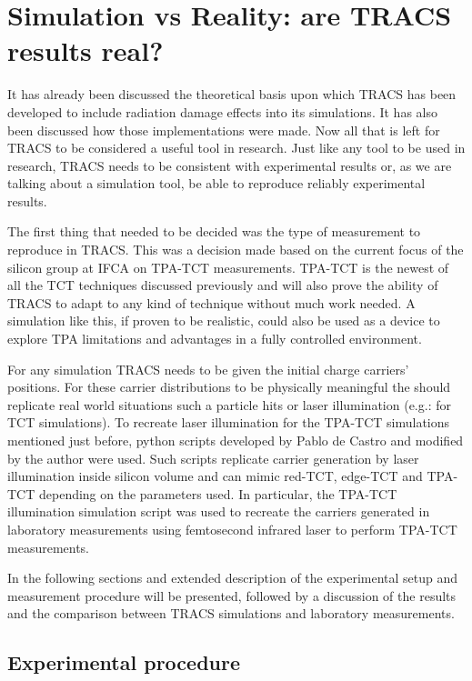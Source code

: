 \chapter{Simulation vs Reality: are TRACS results real?}

It has already been discussed the theoretical basis upon which TRACS has been developed to include radiation damage effects into its simulations. It has also been discussed how those implementations were made. Now all that is left for TRACS to be considered a useful tool in research. Just like any tool to be used in research, TRACS needs to be consistent with experimental results or, as we are talking about a simulation tool, be able to reproduce reliably experimental results.

The first thing that needed to be decided was the type of measurement to reproduce in TRACS. This was a decision made based on the current focus of the silicon group at IFCA \iffalse No se el nombre oficial \fi on TPA-TCT measurements. TPA-TCT is the newest  of all the TCT techniques discussed previously and will also prove the ability of TRACS to adapt to any kind of technique without much work needed. A simulation like this, if proven to be realistic, could also be used as a device to explore TPA limitations and advantages in a fully controlled environment.

For any simulation TRACS needs to be given the initial charge carriers' positions. For these carrier distributions to be physically meaningful the should replicate real world situations such a particle hits or laser illumination (e.g.: for TCT simulations). To recreate laser illumination for the TPA-TCT simulations mentioned just before, python scripts developed by Pablo de Castro and modified by the author were used. Such scripts replicate carrier generation by laser illumination inside silicon volume and can mimic red-TCT, edge-TCT and TPA-TCT depending on the parameters used. In particular, the TPA-TCT illumination simulation script was used to recreate the carriers generated in laboratory measurements using femtosecond infrared laser to perform TPA-TCT measurements.

In the following sections and extended description of the experimental setup and  measurement procedure will be presented, followed by a discussion of the results and the comparison between TRACS simulations and laboratory measurements.

\section{Experimental procedure} %
\label{sec:future_improvements}

